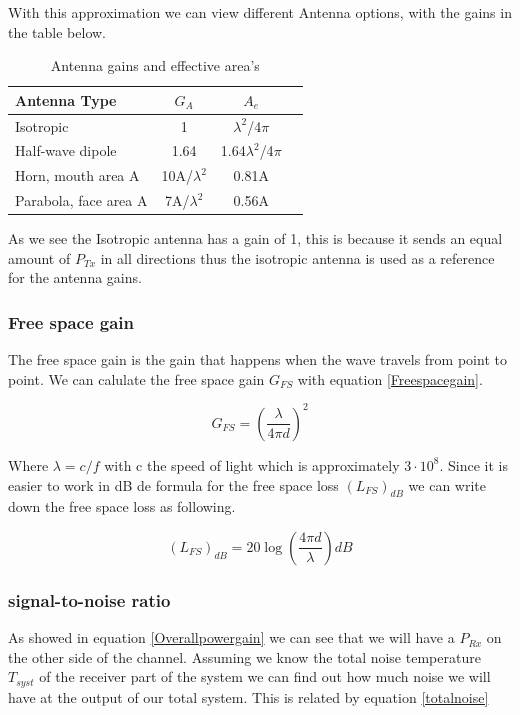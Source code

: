 \documentclass[10pt,a4paper]{article}
\begin{document}
With this approximation we can view different Antenna options, with the gains in the table below.
\begin{table}[!h]
\caption {Antenna gains and effective area's}
\center 
\begin{tabular}{l*{2}{c}r}
Antenna Type      & $G_A$ & $A_e$ \\
\hline
Isotropic 				& 1 & $\lambda^2$/4$\pi$ \\
Half-wave dipole        & 1.64 & 1.64$\lambda^2$/4$\pi$ \\
Horn, mouth area A      & 10A/$\lambda^2$ & 0.81A \\
Parabola, face area A   & 7A/$\lambda^2$ & 0.56A \\
\end{tabular}
\end{table}

As we see the Isotropic antenna has a gain of 1, this is because it sends an equal amount of $P_{Tx}$ in all directions thus the isotropic antenna is used as a reference for the antenna gains.

\subsubsection{Free space gain}
The free space gain is the gain that happens when the wave travels from point to point. We can calulate the free space gain $G_{FS}$ with equation \ref{Freespacegain}.

\begin{equation}
\label{Freespacegain}
G_{FS} = (\frac{\lambda}{4\pi d})^2
\end{equation}

Where $\lambda = c/f$ with c the speed of light which is approximately $3\cdot 10^8$. Since it is easier to work in dB de formula for the free space loss $(L_{FS})_{dB}$ we can write down the free space loss as following.

\begin{equation}
(L_{FS})_{dB} = 20 \log(\frac{4\pi d}{\lambda})dB
\end{equation}

\subsubsection{signal-to-noise ratio}
As showed in equation \ref{Overallpowergain} we can see that we will have a $P_{Rx}$ on the other side of the channel. Assuming we know the total noise temperature $T_{syst}$ of the receiver part of the system we can find out how much noise we will have at the output of our total system. This is related by equation \ref{totalnoise}
\end{document}
